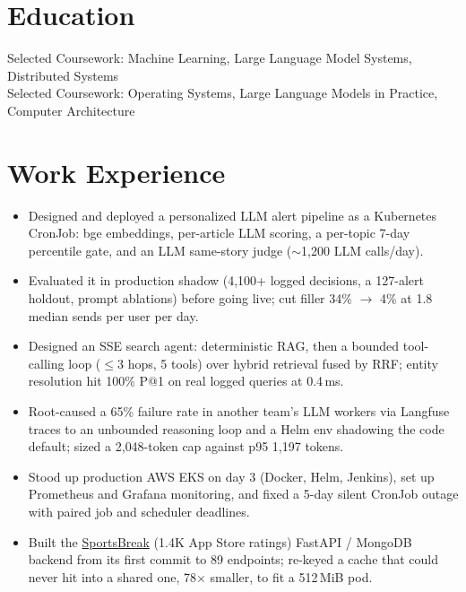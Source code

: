 \documentclass[11pt, letterpaper]{article}
\begin{document}

\section{Education}
Selected Coursework: Machine Learning, Large Language Model Systems, Distributed Systems\\[1pt]
Selected Coursework: Operating Systems, Large Language Models in Practice, Computer Architecture

\section{Work Experience}
\begin{itemize}
  \item Designed and deployed a personalized LLM alert pipeline as a Kubernetes CronJob: bge embeddings, per-article LLM scoring, a per-topic 7-day percentile gate, and an LLM same-story judge ($\sim$1{,}200 LLM calls/day).
  \item Evaluated it in production shadow (4{,}100+ logged decisions, a 127-alert holdout, prompt ablations) before going live; cut filler 34\% $\to$ 4\% at 1.8 median sends per user per day.
  \item Designed an SSE search agent: deterministic RAG, then a bounded tool-calling loop ($\le$3 hops, 5 tools) over hybrid retrieval fused by RRF; entity resolution hit 100\% P@1 on real logged queries at 0.4\,ms.
  \item Root-caused a 65\% failure rate in another team's LLM workers via Langfuse traces to an unbounded reasoning loop and a Helm env shadowing the code default; sized a 2{,}048-token cap against p95 1{,}197 tokens.
  \item Stood up production AWS EKS on day 3 (Docker, Helm, Jenkins), set up Prometheus and Grafana monitoring, and fixed a 5-day silent CronJob outage with paired job and scheduler deadlines.
  \item Built the \href{https://apps.apple.com/app/id6762649287}{SportsBreak} (1.4K App Store ratings) FastAPI / MongoDB backend from its first commit to 89 endpoints; re-keyed a cache that could never hit into a shared one, 78$\times$ smaller, to fit a 512\,MiB pod.
\end{itemize}
\end{document}
